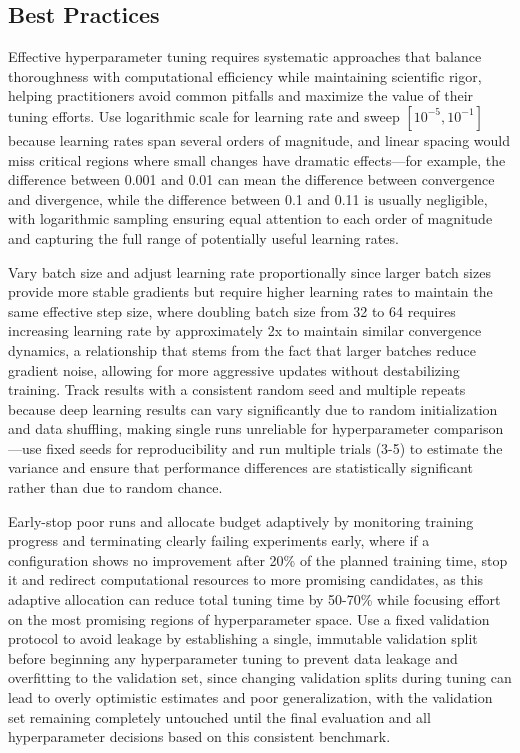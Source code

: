 \subsection{Best Practices}

Effective hyperparameter tuning requires systematic approaches that balance thoroughness with computational efficiency while maintaining scientific rigor, helping practitioners avoid common pitfalls and maximize the value of their tuning efforts. Use logarithmic scale for learning rate and sweep $[10^{-5},10^{-1}]$ because learning rates span several orders of magnitude, and linear spacing would miss critical regions where small changes have dramatic effects—for example, the difference between 0.001 and 0.01 can mean the difference between convergence and divergence, while the difference between 0.1 and 0.11 is usually negligible, with logarithmic sampling ensuring equal attention to each order of magnitude and capturing the full range of potentially useful learning rates.

Vary batch size and adjust learning rate proportionally since larger batch sizes provide more stable gradients but require higher learning rates to maintain the same effective step size, where doubling batch size from 32 to 64 requires increasing learning rate by approximately 2x to maintain similar convergence dynamics, a relationship that stems from the fact that larger batches reduce gradient noise, allowing for more aggressive updates without destabilizing training. Track results with a consistent random seed and multiple repeats because deep learning results can vary significantly due to random initialization and data shuffling, making single runs unreliable for hyperparameter comparison—use fixed seeds for reproducibility and run multiple trials (3-5) to estimate the variance and ensure that performance differences are statistically significant rather than due to random chance.

Early-stop poor runs and allocate budget adaptively by monitoring training progress and terminating clearly failing experiments early, where if a configuration shows no improvement after 20\% of the planned training time, stop it and redirect computational resources to more promising candidates, as this adaptive allocation can reduce total tuning time by 50-70\% while focusing effort on the most promising regions of hyperparameter space. Use a fixed validation protocol to avoid leakage by establishing a single, immutable validation split before beginning any hyperparameter tuning to prevent data leakage and overfitting to the validation set, since changing validation splits during tuning can lead to overly optimistic estimates and poor generalization, with the validation set remaining completely untouched until the final evaluation and all hyperparameter decisions based on this consistent benchmark.


